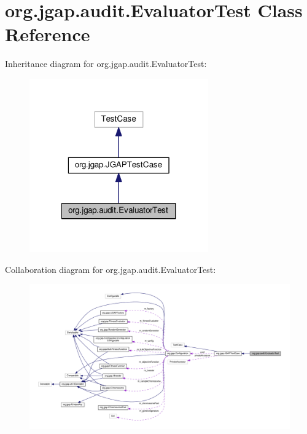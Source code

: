 \hypertarget{classorg_1_1jgap_1_1audit_1_1_evaluator_test}{\section{org.\-jgap.\-audit.\-Evaluator\-Test Class Reference}
\label{classorg_1_1jgap_1_1audit_1_1_evaluator_test}
}


Inheritance diagram for org.\-jgap.\-audit.\-Evaluator\-Test\-:
\nopagebreak
\begin{figure}[H]
\begin{center}
\leavevmode
\includegraphics[width=218pt]{classorg_1_1jgap_1_1audit_1_1_evaluator_test__inherit__graph}
\end{center}
\end{figure}


Collaboration diagram for org.\-jgap.\-audit.\-Evaluator\-Test\-:
\nopagebreak
\begin{figure}[H]
\begin{center}
\leavevmode
\includegraphics[width=350pt]{classorg_1_1jgap_1_1audit_1_1_evaluator_test__coll__graph}
\end{center}
\end{figure}
